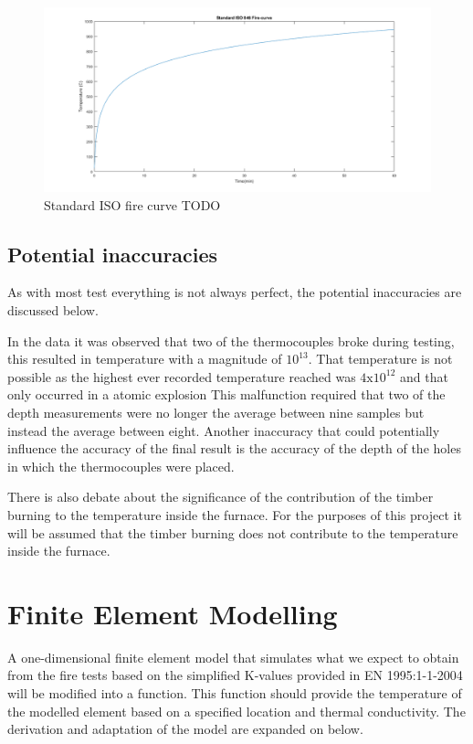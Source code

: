 	\begin{figure}[H]
	\centering 
	\includegraphics[width=\linewidth]{figures/firecurve.png}
	\caption{Standard ISO fire curve TODO}
	\label{firecurve_fig}
	\end{figure}
	
	\subsection{Potential inaccuracies}
	As with most test everything is not always perfect, the potential inaccuracies are discussed below. 
	
	In the data it was observed that two of the thermocouples broke during testing, this resulted in temperature with a magnitude of $10^{13}$. 
	That temperature is not possible as the highest ever recorded temperature reached was $4\text{x}10^{12}$ and that only occurred in a atomic explosion %
	This malfunction required that two of the depth measurements were no longer the average between nine samples but instead the average between eight.
	Another inaccuracy that could potentially influence the accuracy of the final result is the accuracy of the depth of the holes in which the thermocouples were placed. 
	
	There is also debate about the significance of the contribution of the timber burning to the temperature inside the furnace. 
	For the purposes of this project it will be assumed that the timber burning does not contribute to the temperature inside the furnace.
	
\section{Finite Element Modelling}
A one-dimensional finite element model that simulates what we expect to obtain from the fire tests based on the simplified K-values provided in EN 1995:1-1-2004 will be modified into a function.
This function should provide the temperature of the modelled element based on a specified location and thermal conductivity.
The derivation and adaptation of the model are expanded on below.
